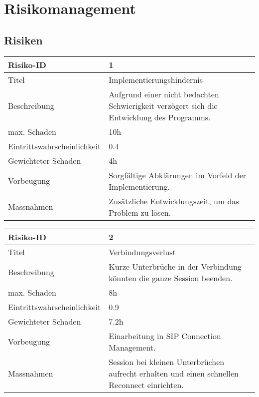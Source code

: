 \chapter{Risikomanagement}
\section{Risiken}

\noindent
\begin{tabular}{|p{} | p{} |}
	\hline	
	Risiko-ID & 1 \\
	\hline
	Titel & Implementierungshindernis \\
	Beschreibung & Aufgrund einer nicht bedachten Schwierigkeit verzögert sich die
	Entwicklung des Programms. \\
	max. Schaden	& 10h \\
	Eintrittswahrscheinlichkeit & 0.4 \\
	Gewichteter Schaden	& 4h \\
	Vorbeugung	& Sorgfältige Abklärungen im Vorfeld der Implementierung. \\
	Massnahmen	& Zusätzliche Entwicklungszeit, um das Problem zu lösen. \\
	\hline
\end{tabular}
\hspace{0.5cm}
\newline

\noindent
\begin{tabular}{|p{} | p{} |}
	\hline	
	Risiko-ID & 2 \\
	\hline
	Titel & Verbindungsverlust \\
	Beschreibung & Kurze Unterbrüche in der Verbindung könnten die ganze Session
	beenden. \\
	max. Schaden	& 8h \\
	Eintrittswahrscheinlichkeit & 0.9 \\
	Gewichteter Schaden	& 7.2h \\
	Vorbeugung	& Einarbeitung in SIP Connection Management. \\
	Massnahmen	& Session bei kleinen Unterbrüchen aufrecht erhalten und einen
	schnellen Reconnect einrichten. \\
	\hline
\end{tabular}
\hspace{0.5cm}
\newline
	
